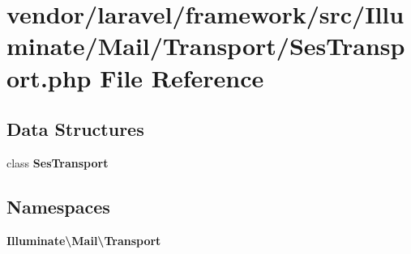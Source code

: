 \section{vendor/laravel/framework/src/\+Illuminate/\+Mail/\+Transport/\+Ses\+Transport.php File Reference}
\label{_ses_transport_8php}
\subsection*{Data Structures}
\begin{DoxyCompactItemize}
\item 
class {\bf Ses\+Transport}
\end{DoxyCompactItemize}
\subsection*{Namespaces}
\begin{DoxyCompactItemize}
\item 
 {\bf Illuminate\textbackslash{}\+Mail\textbackslash{}\+Transport}
\end{DoxyCompactItemize}
